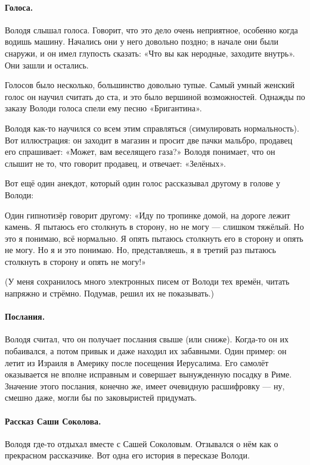 \documentclass{book}
\begin{document}
\paragraph{Голоса.}
Володя слышал голоса.
Говорит, что это дело очень неприятное, особенно когда водишь машину.
Начались они у него довольно поздно;
в начале они были снаружи, и он имел глупость сказать: «Что вы как неродные, заходите внутрь».
Они зашли и остались.

Голосов было несколько, большинство довольно тупые.
Самый умный женский голос он научил считать до ста, и это было вершиной возможностей.
Однажды по заказу Володи голоса спели ему песню «Бригантина».

Володя как-то научился со всем этим справляться (симулировать нормальность).
Вот иллюстрация: он заходит в магазин и просит две пачки мальбро, продавец его спрашивает: «Может, вам веселящего газа?»
Володя понимает, что он слышит не то, что говорит продавец, и отвечает: «Зелёных».

Вот ещё один анекдот, который один голос рассказывал другому в голове у Володи:

Один гипнотизёр говорит другому:
«Иду по тропинке домой, на дороге лежит камень.
Я пытаюсь его столкнуть в сторону, но не могу --- слишком тяжёлый.
Но это я понимаю, всё нормально.
Я опять пытаюсь столкнуть его в сторону и опять не могу.
Но я и это понимаю.
Но, представляешь, я в третий раз пытаюсь столкнуть в сторону и опять  не могу!»

(У меня сохранилось много электронных писем от Володи тех времён, читать напряжно и стрёмно.
Подумав, решил их не показывать.)

\paragraph{Послания.}
Володя считал, что он получает послания свыше (или сниже).
Когда-то он их побаивался, а потом привык и даже находил их забавными.
Один пример: он летит из Израиля в Америку после посещения Иерусалима.
Его самолёт оказывается не вполне исправным и совершает вынужденную посадку в Риме.
Значение этого послания, конечно же, имеет очевидную расшифровку --- ну, смешно даже, могли бы
по заковыристей придумать.

\paragraph{Рассказ Саши Соколова.}
Володя где-то отдыхал вместе с Сашей Соколовым.
Отзывался о нём как о прекрасном рассказчике.
Вот одна его история в пересказе Володи.
\end{document}
